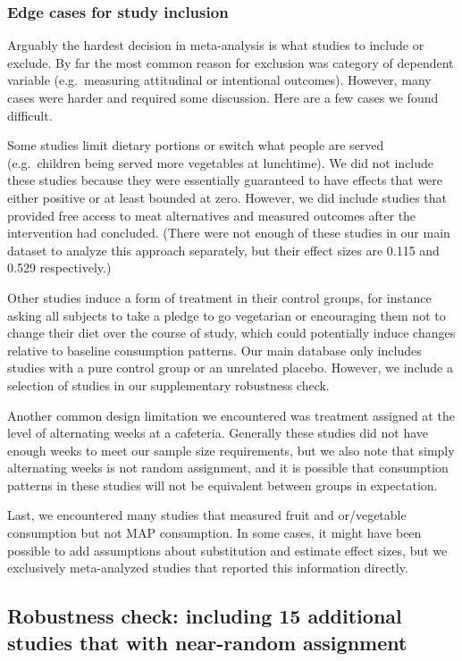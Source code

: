 \documentclass[sn-nature,referee,pdflatex]{sn-jnl}
\begin{document}
\subsubsection{Edge cases for study
inclusion}\label{edge-cases-for-study-inclusion}

Arguably the hardest decision in meta-analysis is what studies to
include or exclude. By far the most common reason for exclusion was
category of dependent variable (e.g.~measuring attitudinal or
intentional outcomes). However, many cases were harder and required some
discussion. Here are a few cases we found difficult.

Some studies limit dietary portions or switch what people are served
(e.g.~children being served more vegetables at lunchtime). We did not
include these studies because they were essentially guaranteed to have
effects that were either positive or at least bounded at zero. However,
we did include studies that provided free access to meat alternatives
\citep{acharya2004, bianchi2022} and measured outcomes after the
intervention had concluded. (There were not enough of these studies in
our main dataset to analyze this approach separately, but their effect
sizes are 0.115 and 0.529 respectively.)

Other studies induce a form of treatment in their control groups, for
instance asking all subjects to take a pledge to go vegetarian or
encouraging them not to change their diet over the course of study,
which could potentially induce changes relative to baseline consumption
patterns. Our main database only includes studies with a pure control
group or an unrelated placebo. However, we include a selection of
studies in our supplementary robustness check.

Another common design limitation we encountered was treatment assigned
at the level of alternating weeks at a cafeteria. Generally these
studies did not have enough weeks to meet our sample size requirements,
but we also note that simply alternating weeks is not random assignment,
and it is possible that consumption patterns in these studies will not
be equivalent between groups in expectation.

Last, we encountered many studies that measured fruit and or/vegetable
consumption but not MAP consumption. In some cases, it might have been
possible to add assumptions about substitution and estimate effect
sizes, but we exclusively meta-analyzed studies that reported this
information directly.

\subsection{Robustness check: including 15 additional studies that with
near-random
assignment}\label{robustness-check-including-15-additional-studies-that-with-near-random-assignment}
\end{document}
